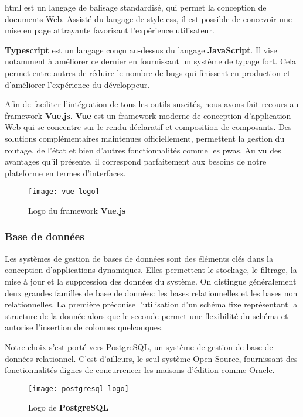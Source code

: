 \acrshort{html} est un langage de balisage standardisé, qui permet la conception de documents Web. 
Assisté du langage de style \acrshort{css}, il est possible de concevoir une mise en page attrayante favorisant l'expérience utilisateur.

\textbf{Typescript} est un langage conçu au-dessus du langage \textbf{JavaScript}. 
Il vise notamment à améliorer ce dernier en fournissant un système de typage fort. 
Cela permet entre autres de réduire le nombre de bugs qui finissent en production et d'améliorer l'expérience du développeur.

Afin de faciliter l'intégration de tous les outils suscités, nous avons fait recours au framework \textbf{Vue.js}. 
\textbf{Vue} est un framework moderne de conception d’application Web qui se concentre sur le rendu déclaratif et composition de composants. 
Des solutions complémentaires maintenues officiellement, permettent la gestion du routage, de l'état et bien d’autres fonctionnalités comme les \acrshort{pwa}s. 
Au vu des avantages qu’il présente, il correspond parfaitement aux besoins de notre plateforme en termes d’interfaces.

\begin{figure}[h]
  \centering
  \texttt{[image: vue-logo]}
  \caption{Logo du framework \textbf{Vue.js}}
  \label{fig:vue_logo}
\end{figure}


\subsubsection{Base de données}
Les systèmes de gestion de bases de données sont des éléments clés dans la conception d’applications dynamiques. 
Elles permettent le stockage, le filtrage, la mise à jour et la suppression des données du système. 
On distingue généralement deux grandes familles de base de données: les bases relationnelles et les bases non relationnelles. 
La première préconise l’utilisation d’un schéma fixe représentant la structure de la donnée alors que le seconde permet une flexibilité du schéma et autorise l’insertion de colonnes quelconques.

Notre choix s’est porté vers PostgreSQL, un système de gestion de base de données relationnel. 
C’est d’ailleurs, le seul système Open Source, fournissant des fonctionnalités dignes de concurrencer les maisons d'édition comme Oracle.

\begin{figure}[H]
  \centering
  \texttt{[image: postgresql-logo]}
  \caption{Logo de \textbf{PostgreSQL}}
  \label{fig:pg_logo}
\end{figure}

